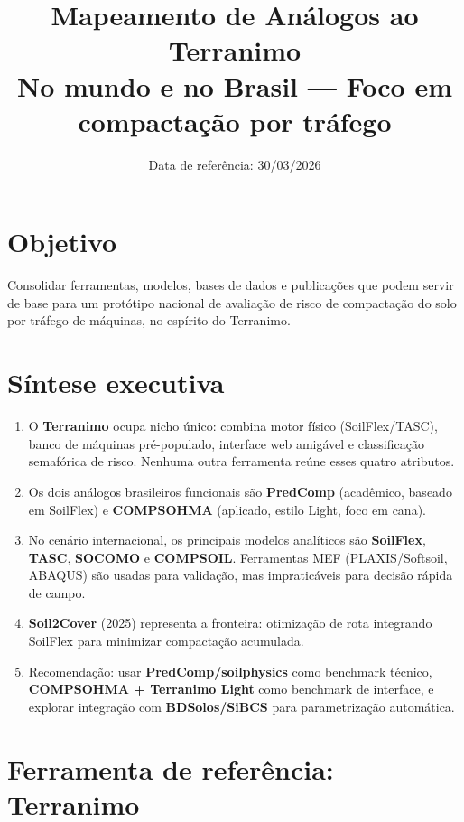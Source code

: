 \documentclass[12pt,a4paper]{article}
\title{Mapeamento de Análogos ao Terranimo\\
\large No mundo e no Brasil --- Foco em compactação por tráfego}
\author{}
\date{Data de referência: 30/03/2026}
\newcommand{\Section}[1]{\needspace{12\baselineskip}\section{#1}}
\newenvironment{NoBreakEnumerate}
{\begin{samepage}\begin{enumerate}}
{\end{enumerate}\end{samepage}}
\begin{document}
\maketitle
\vspace{-1.2em}

\Section{Objetivo}
Consolidar ferramentas, modelos, bases de dados e publicações que podem servir de base para um protótipo nacional de avaliação de risco de compactação do solo por tráfego de máquinas, no espírito do Terranimo.

\Section{Síntese executiva}
\begin{NoBreakEnumerate}
  \item O \textbf{Terranimo} ocupa nicho único: combina motor físico (SoilFlex/TASC), banco de máquinas pré-populado, interface web amigável e classificação semafórica de risco. Nenhuma outra ferramenta reúne esses quatro atributos.
  \item Os dois análogos brasileiros funcionais são \textbf{PredComp} (acadêmico, baseado em SoilFlex) e \textbf{COMPSOHMA} (aplicado, estilo Light, foco em cana).
  \item No cenário internacional, os principais modelos analíticos são \textbf{SoilFlex}, \textbf{TASC}, \textbf{SOCOMO} e \textbf{COMPSOIL}. Ferramentas MEF (PLAXIS/Softsoil, ABAQUS) são usadas para validação, mas impraticáveis para decisão rápida de campo.
  \item \textbf{Soil2Cover} (2025) representa a fronteira: otimização de rota integrando SoilFlex para minimizar compactação acumulada.
  \item Recomendação: usar \textbf{PredComp/soilphysics} como benchmark técnico, \textbf{COMPSOHMA + Terranimo Light} como benchmark de interface, e explorar integração com \textbf{BDSolos/SiBCS} para parametrização automática.
\end{NoBreakEnumerate}

\Section{Ferramenta de referência: Terranimo}
\end{document}

